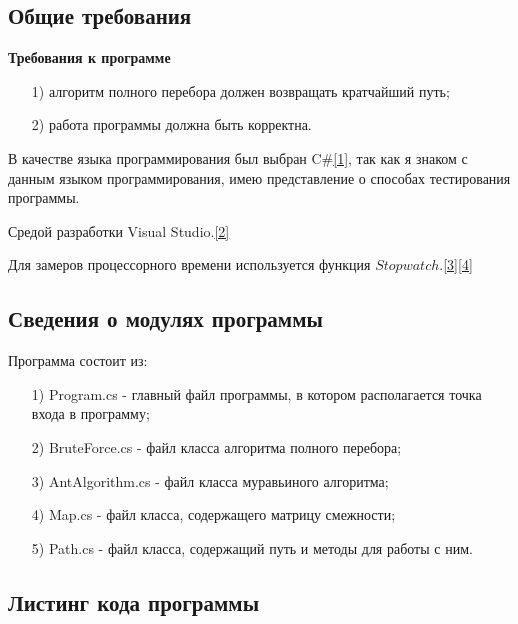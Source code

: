 \documentclass[14pt, a4paper]{extarticle}
\begin{document}
\subsection{Общие требования}
\textbf{Требования к программе}
\begin{enumerate}
	\item[1)] алгоритм полного перебора должен возвращать кратчайший путь;
	\item[2)] работа программы должна быть корректна.
\end{enumerate}
В качестве языка программирования был выбран C\#\hyperref[literature]{[1]}, так как я знаком с данным языком программирования, имею представление о способах тестирования программы.\par
Средой разработки Visual Studio.\hyperref[literature]{[2]}\par 
Для замеров процессорного времени используется функция $Stopwatch$.\hyperref[literature]{[3]}\hyperref[literature]{[4]}\par
\subsection{Сведения о модулях программы}
Программа состоит из:
\begin{enumerate}
	\item[1)] Program.cs - главный файл программы, в котором располагается точка входа в программу;
	\item[2)] BruteForce.cs - файл класса алгоритма полного перебора;
	\item[3)] AntAlgorithm.cs - файл класса муравьиного алгоритма;
	\item[4)] Map.cs - файл класса, содержащего матрицу смежности;
	\item[5)] Path.cs - файл класса, содержащий путь и методы для работы с ним.
\end{enumerate}
\subsection{Листинг кода программы}
\end{document}
